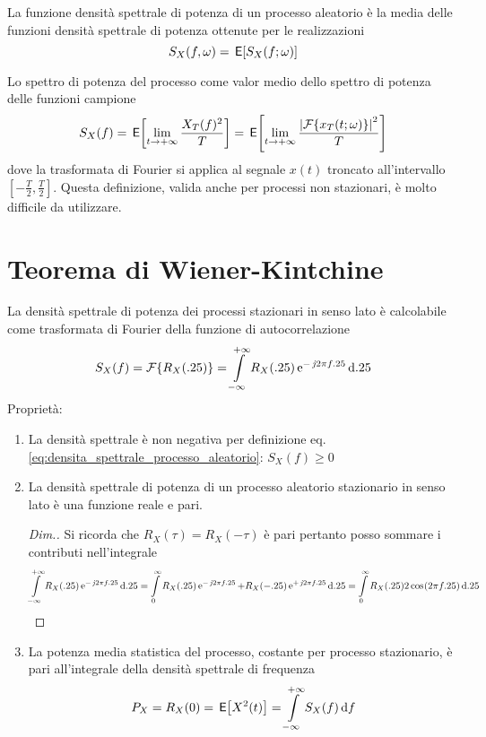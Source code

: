 La funzione densità spettrale di potenza di un processo aleatorio è la media delle funzioni densità spettrale di potenza ottenute per le realizzazioni
\begin{equation}
S_X(f,\omega)=\,{\operatorname{\mathsf{E}}}\!\left[{S_X(f;\omega)}\right]
\end{equation}

Lo spettro di potenza del processo come valor medio dello spettro di potenza delle funzioni campione
\begin{equation}\label{eq:densita_spettrale_processo_aleatorio}S_X(f)=\,{\operatorname{\mathsf{E}}}\!\left[{\lim\limits_{t\to+\infty}\frac{X_T(f)^2}{T}}\right]=\,{\operatorname{\mathsf{E}}}\!\left[{\lim\limits_{t\to+\infty}\frac{\left|{\operatorname{\mathcal{F}}\!\left\lbrace{x_T(t;\omega)}\right\rbrace}\right|^2}{T}}\right]\end{equation}
dove la trasformata di Fourier si applica al segnale $x(t)$ troncato all'intervallo $[-\frac{T}{2},\frac{T}{2}]$.
Questa definizione, valida anche per processi non stazionari, è molto difficile da utilizzare.

\section{Teorema di Wiener-Kintchine}
La densità spettrale di potenza dei processi stazionari in senso lato è calcolabile come trasformata di Fourier della funzione di autocorrelazione
\begin{equation}
S_X(f)=\operatorname{\mathcal{F}}\!\left\lbrace{R_X(.25)}\right\rbrace=\int\limits_{-\infty}^{+\infty}{R_X(.25)\operatorname{e}^{-\operatorname{\mathit{j}\!} 2\pi f.25}}{\,\mathop{}\!\mathrm{d}{.25}}
\end{equation}
Proprietà:
\begin{enumerate}
\item La densità spettrale è non negativa per definizione eq.\ref{eq:densita_spettrale_processo_aleatorio}: $S_X(f)\geq 0$
\item La densità spettrale di potenza di un processo aleatorio stazionario in senso lato è una funzione reale e pari.
\begin{proof}[Dim.]
Si ricorda che $R_X(\tau)=R_X(-\tau)$ è pari pertanto posso sommare i contributi nell'integrale
\[\int\limits_{-\infty}^{+\infty}{R_X(.25)\operatorname{e}^{-\operatorname{\mathit{j}\!} 2\pi f.25}}{\,\mathop{}\!\mathrm{d}{.25}}=\int\limits_{0}^{\infty}{R_X(.25)\operatorname{e}^{-\operatorname{\mathit{j}\!} 2\pi f.25}+R_X(-.25)\operatorname{e}^{+\operatorname{\mathit{j}\!} 2\pi f.25}}{\,\mathop{}\!\mathrm{d}{.25}}=\int\limits_{0}^{\infty}{R_X(.25)2\,{\operatorname{cos}}^{}\!\left({2\pi f.25}\right)}{\,\mathop{}\!\mathrm{d}{.25}}\]
\end{proof}
\item La potenza media statistica del processo, costante per processo stazionario, è pari all'integrale della densità spettrale di frequenza 
\begin{equation}
P_X=R_X(0)=\,{\operatorname{\mathsf{E}}}\!\left[{X^2(t)}\right]=\int\limits_{-\infty}^{+\infty}{S_X(f)}{\,\mathop{}\!\mathrm{d}{f}}
\end{equation}
\end{enumerate}


